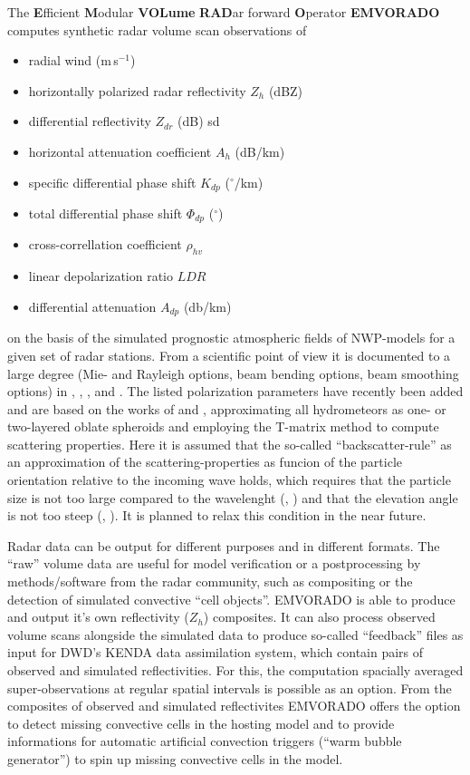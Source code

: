 \documentclass[10pt,a4paper,twoside,headinclude,footinclude,parskip=half]{scrartcl}
\newcommand{\grad}{\ensuremath{^{\circ}}\xspace}
\newcommand{\citeP}[1]{\citet{#1}}
\newcommand{\citeNPK}[1]{\citeauthor{#1}, \citeyear{#1}}
\begin{document}
The \textbf{E}fficient \textbf{M}odular \textbf{VOLume} \textbf{RAD}ar forward \textbf{O}perator \textbf{EMVORADO} computes
synthetic radar volume scan observations of
\begin{itemize}
\item[-] radial wind (m\,s$^{-1}$)
\item[-] horizontally polarized radar reflectivity $Z_h$ (dBZ)
\item[-] differential reflectivity $Z_{dr}$ (dB)
sd\item[-] horizontal attenuation coefficient $A_h$ (dB/km)
\item[-] specific differential phase shift $K_{dp}$ (\grad/km)
\item[-] total differential phase shift $\Phi_{dp}$ (\grad)
\item[-] cross-correllation coefficient $\rho_{hv}$
\item[-] linear depolarization ratio $LDR$
\item[-] differential attenuation $A_{dp}$ (db/km)
\end{itemize}
on the basis of the simulated prognostic atmospheric fields of NWP-models for a given set of radar stations. 
From a scientific point of view it is documented to a large degree (Mie- and Rayleigh options, beam bending options, beam smoothing options) in \citeP{blahak2016a}, \citeP{zeng2013}, \citeP{jerger2014}, \citeP{zeng2014} and \citeP{zeng2016a}.
The listed polarization parameters have recently been added and are based on the works of \citeP{ryzhkov2001} and  \citeP{ryzhkov2011}, approximating all hydrometeors
as one- or two-layered oblate spheroids and employing the T-matrix method to compute scattering properties. Here it is assumed that the so-called
``backscatter-rule'' as an approximation of the scattering-properties as funcion of the particle orientation relative to the incoming wave holds,
which requires that the particle size is not too large compared to the wavelenght (\citeNPK{ryzhkov2001}) and that the elevation angle is not too steep (\citeNPK{ryzhkov2011}). It is planned to relax this condition in the
near future.

Radar data can be output for different purposes and in different formats. The ``raw'' volume data are useful for
model verification or a postprocessing by methods/software from the radar community, such
as compositing or the detection of simulated convective ``cell objects''. EMVORADO is able to
produce and output it's own reflectivity ($Z_h$) composites. It can also process observed volume scans alongside the simulated
data to produce so-called ``feedback'' files as input for DWD's KENDA data assimilation system, which contain
pairs of observed and simulated reflectivities. For this, the computation spacially averaged super-observations at regular spatial intervals is possible as an option.
From the composites of observed and simulated reflectivites EMVORADO offers the option to detect missing convective cells
in the hosting model and to provide informations for automatic artificial convection triggers (``warm bubble generator'')
to spin up missing convective cells in the model.
\end{document}
